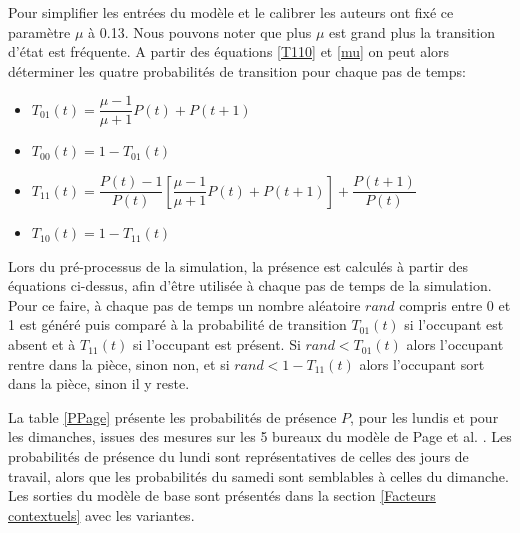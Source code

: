 Pour simplifier les entrées du modèle et le calibrer les auteurs ont fixé ce paramètre $\mu$ à 0.13. Nous pouvons noter que plus $\mu$ est grand plus la transition d'état est fréquente.
A partir des équations \eqref{T110} et \eqref{mu} on peut alors déterminer les quatre probabilités de transition pour chaque pas de temps:

\begin{itemize}
\item $T_{01}(t)=\dfrac{\mu-1}{\mu+1}P(t)+P(t+1)$
\item $T_{00}(t)=1-T_{01}(t)$
\item $T_{11}(t)=\dfrac{P(t)-1}{P(t)}\left[\dfrac{\mu-1}{\mu+1}P(t)+P(t+1)\right]+\dfrac{P(t+1)}{P(t)}$
\item $T_{10}(t)=1-T_{11}(t)$
\end{itemize}

Lors du pré-processus de la simulation, la présence est calculés à partir des équations ci-dessus, afin d'être utilisée à chaque pas de temps de la simulation. Pour ce faire, à chaque pas de temps un nombre aléatoire $rand$ compris entre 0 et 1 est généré puis comparé à la probabilité de transition $T_{01}(t)$ si l'occupant est absent et à $T_{11}(t)$ si l'occupant est présent. Si $rand < T_{01}(t)$ alors l'occupant rentre dans la pièce, sinon non, et si $rand < 1-T_{11}(t)$ alors l'occupant sort dans la pièce, sinon il y reste.

La table \ref{PPage} présente les probabilités de présence $P$, pour les lundis et pour les dimanches, issues des mesures sur les 5 bureaux du modèle de Page et al. \cite{Page-08}. Les probabilités de présence du lundi sont représentatives de celles des jours de travail, alors que les probabilités du samedi sont semblables à celles du dimanche. Les sorties du modèle de base sont présentés dans la section \ref{Facteurs contextuels} avec les variantes.

